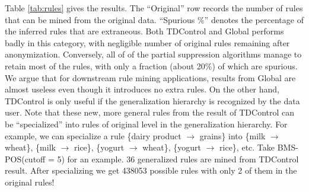 Table \ref{tab:rules} gives the results. The ``Original'' row records the
number of rules that can be mined from the original data. ``Spurious \%''
denotes the percentage of the inferred rules that are extraneous.
Both TDControl and Global performs badly in this category, with
negligible number of original rules remaining after anonymization.
Conversely, all of of the partial
suppression algorithms manage to retain most of the rules, with only a
fraction (about 20\%) of which are spurious. We argue that for downstream
rule mining applications, results from Global are almost
useless even though it introduces no extra rules. On the other hand, TDControl
is only useful if the generalization hierarchy is recognized by the data user.
Note that these new, more general rules from the result of TDControl can be
``specialized'' into rules of original level in the generalization hierarchy.
For example, we can specialize a rule \{dairy product $\rightarrow$ grains\}
into
\{milk $\rightarrow$ wheat\},
\{milk $\rightarrow$ rice\},
\{yogurt $\rightarrow$ wheat\},
\{yogurt $\rightarrow$ rice\}, etc.
Take BMS-POS(cutoff = 5) for an example. 36 generalized rules are
mined from TDControl result. After specializing we get
438053 possible rules with only 2 of them in the original rules!

